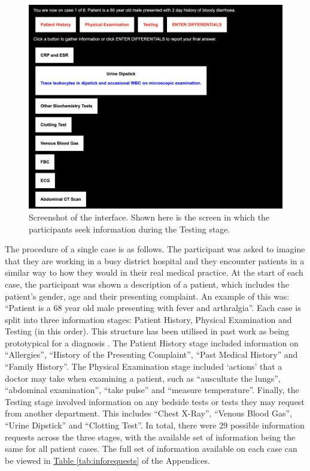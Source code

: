 \documentclass[a4paper, nobind]{templates/ociamthesis}
\begin{document}
\newpage

\begin{figure}[H]

{\centering \includegraphics[width=1\linewidth]{./assets/Screenshot1} 

}

\caption[Online Study: Screenshot 1]{Screenshot of the interface. Shown here is the screen in which the participants seek information during the Testing stage.}\label{fig:screenshot1}
\end{figure}

The procedure of a single case is as follows. The participant was asked to imagine that they are working in a busy district hospital and they encounter patients in a similar way to how they would in their real medical practice. At the start of each case, the participant was shown a description of a patient, which includes the patient's gender, age and their presenting complaint. An example of this was: ``Patient is a 68 year old male presenting with fever and arthralgia''. Each case is split into three information stages: Patient History, Physical Examination and Testing (in this order). This structure has been utilised in past work as being prototypical for a diagnosis \autocite{hampton_relative_1975,peterson_contributions_1992}. The Patient History stage included information on ``Allergies'', ``History of the Presenting Complaint'', ``Past Medical History'' and ``Family History''. The Physical Examination stage included `actions' that a doctor may take when examining a patient, such as ``auscultate the lungs'', ``abdominal examination'', ``take pulse'' and ``measure temperature''. Finally, the Testing stage involved information on any bedside tests or tests they may request from another department. This includes ``Chest X-Ray'', ``Venous Blood Gas'', ``Urine Dipstick'' and ``Clotting Test''. In total, there were 29 possible information requests across the three stages, with the available set of information being the same for all patient cases. The full set of information available on each case can be viewed in \hyperref[tab:inforequests]{Table \ref{tab:inforequests}} of the Appendices.\\
\end{document}
